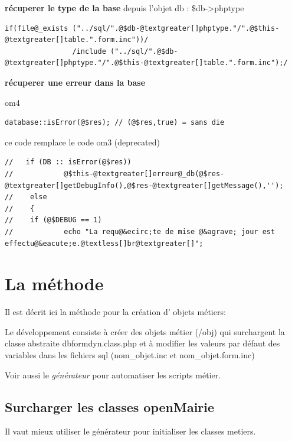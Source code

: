 \documentclass[letterpaper,10pt,french]{manual}
\begin{document}
\textbf{récuperer le type de la base} depuis l'objet db : \$db-\textgreater{}phptype

\begin{Verbatim}[commandchars=@\[\]]
if(file@_exists ("../sql/".@$db-@textgreater[]phptype."/".@$this-@textgreater[]table.".form.inc"))/
                /include ("../sql/".@$db-@textgreater[]phptype."/".@$this-@textgreater[]table.".form.inc");/
\end{Verbatim}

\textbf{récuperer une erreur dans la base}

om4

\begin{Verbatim}[commandchars=@\[\]]
database::isError(@$res); // (@$res,true) = sans die
\end{Verbatim}

ce code remplace le code om3 (deprecated)

\begin{Verbatim}[commandchars=@\[\]]
//   if (DB :: isError(@$res))
//            @$this-@textgreater[]erreur@_db(@$res-@textgreater[]getDebugInfo(),@$res-@textgreater[]getMessage(),'');
//    else
//    {
//    if (@$DEBUG == 1)
//            echo "La requ@&ecirc;te de mise @&agrave; jour est effectu@&eacute;e.@textless[]br@textgreater[]";
\end{Verbatim}

\resetcurrentobjects
\hypertarget{--doc-framework/methode}{}

\hypertarget{methode}{}\section{La méthode}

Il est décrit ici la méthode pour la création d' objets métiers:

Le développement consiste à créer des objets métier (/obj) qui surchargent
la classe abstraite  dbformdyn.class.php et à modifier les valeurs par défaut
des variables dans les fichiers sql (nom\_objet.inc et nom\_objet.form.inc)

Voir aussi le \emph{générateur} pour automatiser les scripts métier.


\subsection{Surcharger les classes openMairie}

Il vaut mieux utiliser le générateur pour initialiser les classes metiers.
\end{document}
